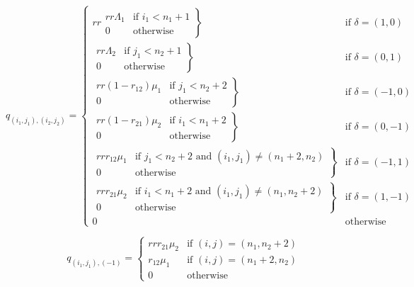 \documentclass{article}
\numberwithin{equation}{section}
\begin{document}
\begin{equation}
  q_{(i_1, j_1),(i_2, j_2)} = \left\{
  \begin{matrix}{rr}
    \left. \begin{matrix}{rr}
      \Lambda_1 & \text{if } i_1 < n_1 + 1 \\
      0 & \text{otherwise}
    \end{matrix} \right\} & \text{if } \delta = (1, 0) \\
    \left. \begin{matrix}{rr}
      \Lambda_2 & \text{if } j_1 < n_2 + 1 \\
      0 & \text{otherwise}
    \end{matrix} \right\} & \text{if } \delta = (0, 1) \\
    \left. \begin{matrix}{rr}
      (1 - r_{12})\mu_1 & \text{if } j_1 < n_2 + 2 \\
      0 & \text{otherwise}
    \end{matrix} \right\} & \text{if } \delta = (-1, 0) \\
    \left. \begin{matrix}{rr}
      (1 - r_{21})\mu_2 & \text{if } i_1 < n_1 + 2 \\
      0 & \text{otherwise}
    \end{matrix} \right\} & \text{if } \delta = (0, -1) \\
    \left. \begin{matrix}{rr}
      r_{12}\mu_1 & \text{if } j_1 < n_2 + 2 \text{ and } (i_1, j_1) \neq (n_1 + 2, n_2) \\
      0 & \text{otherwise}
    \end{matrix} \right\} & \text{if } \delta = (-1, 1) \\
    \left. \begin{matrix}{rr}
      r_{21}\mu_2 & \text{if } i_1 < n_1 + 2 \text{ and } (i_1, j_1) \neq (n_1, n_2 + 2) \\
      0 & \text{otherwise}
    \end{matrix} \right\} & \text{if } \delta = (1, -1) \\
    0 & \text{otherwise}
  \end{matrix} \right.
\end{equation}

\begin{equation}
  q_{(i_1, j_1), (-1)} = \left\{
  \begin{matrix}{rr}
    r_{21}\mu_2 & \text{if } (i, j) = (n_1, n_2 + 2) \\
    r_{12}\mu_1 & \text{if } (i, j) = (n_1 + 2, n_2) \\
    0 & \text{otherwise}
  \end{matrix}
  \right.
\end{equation}
\end{document}
